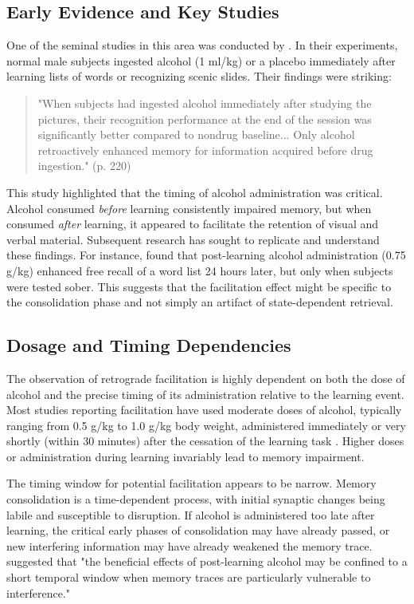 \documentclass[12pt, a4paper]{article}
\begin{document}
\subsection{Early Evidence and Key Studies}
One of the seminal studies in this area was conducted by \cite{Parker1980}. In their experiments, normal male subjects ingested alcohol (1 ml/kg) or a placebo immediately after learning lists of words or recognizing scenic slides. Their findings were striking:
\begin{quote}
    "When subjects had ingested alcohol immediately after studying the pictures, their recognition performance at the end of the session was significantly better compared to nondrug baseline... Only alcohol retroactively enhanced memory for information acquired before drug ingestion." (p. 220)
\end{quote}
This study highlighted that the timing of alcohol administration was critical. Alcohol consumed \textit{before} learning consistently impaired memory, but when consumed \textit{after} learning, it appeared to facilitate the retention of visual and verbal material. Subsequent research has sought to replicate and understand these findings. For instance, \cite{Lamberty1990} found that post-learning alcohol administration (0.75 g/kg) enhanced free recall of a word list 24 hours later, but only when subjects were tested sober. This suggests that the facilitation effect might be specific to the consolidation phase and not simply an artifact of state-dependent retrieval.

\subsection{Dosage and Timing Dependencies}
The observation of retrograde facilitation is highly dependent on both the dose of alcohol and the precise timing of its administration relative to the learning event.
Most studies reporting facilitation have used moderate doses of alcohol, typically ranging from 0.5 g/kg to 1.0 g/kg body weight, administered immediately or very shortly (within 30 minutes) after the cessation of the learning task \cite{Knowles1991, Bruce1999}. Higher doses or administration during learning invariably lead to memory impairment.

The timing window for potential facilitation appears to be narrow. Memory consolidation is a time-dependent process, with initial synaptic changes being labile and susceptible to disruption. If alcohol is administered too late after learning, the critical early phases of consolidation may have already passed, or new interfering information may have already weakened the memory trace. \cite{Mueller1983} suggested that "the beneficial effects of post-learning alcohol may be confined to a short temporal window when memory traces are particularly vulnerable to interference."
\end{document}
